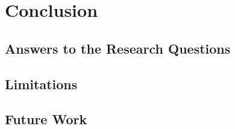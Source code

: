 \chapter{Conclusion}
\label{ch:conclusion}

\section{Answers to the Research Questions}

\section{Limitations}

\section{Future Work}

